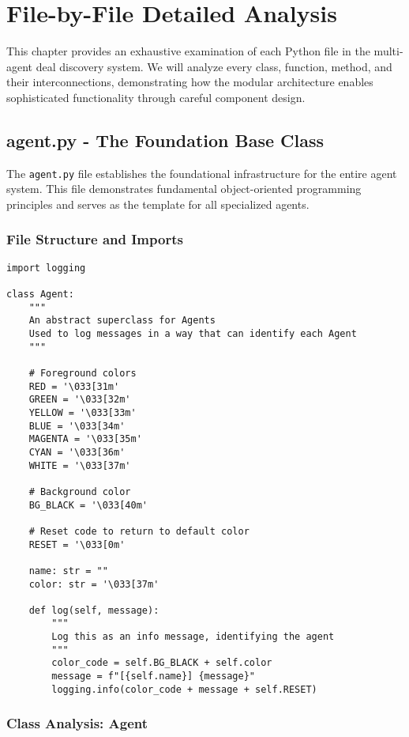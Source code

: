 \chapter{File-by-File Detailed Analysis}

This chapter provides an exhaustive examination of each Python file in the multi-agent deal discovery system. We will analyze every class, function, method, and their interconnections, demonstrating how the modular architecture enables sophisticated functionality through careful component design.

\section{agent.py - The Foundation Base Class}

The \texttt{agent.py} file establishes the foundational infrastructure for the entire agent system. This file demonstrates fundamental object-oriented programming principles and serves as the template for all specialized agents.

\subsection{File Structure and Imports}

\begin{lstlisting}[caption=agent.py - Complete File Analysis]
import logging

class Agent:
    """
    An abstract superclass for Agents
    Used to log messages in a way that can identify each Agent
    """

    # Foreground colors
    RED = '\033[31m'
    GREEN = '\033[32m'
    YELLOW = '\033[33m'
    BLUE = '\033[34m'
    MAGENTA = '\033[35m'
    CYAN = '\033[36m'
    WHITE = '\033[37m'
    
    # Background color
    BG_BLACK = '\033[40m'
    
    # Reset code to return to default color
    RESET = '\033[0m'

    name: str = ""
    color: str = '\033[37m'

    def log(self, message):
        """
        Log this as an info message, identifying the agent
        """
        color_code = self.BG_BLACK + self.color
        message = f"[{self.name}] {message}"
        logging.info(color_code + message + self.RESET)
\end{lstlisting}

\subsection{Class Analysis: Agent}

